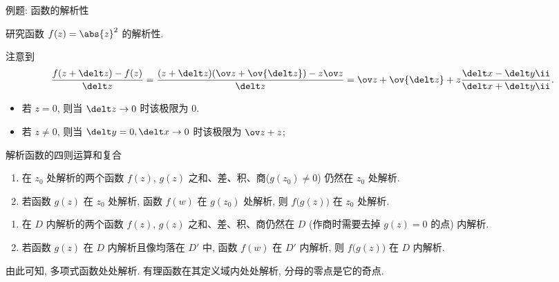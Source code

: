 \begin{frame}{例题: 函数的解析性}
	\onslide<+->
	\begin{example}[nearnext]
		研究函数 $f(z)=\abs{z}^2$ 的解析性.
	\end{example}
	\onslide<+->
	\begin{solution}[nearprev]
		注意到
		\[
			\frac{f(z+\delt z)-f(z)}{\delt z}
			=\frac{(z+\delt z)(\ov z+\ov{\delt z})-z\ov z}{\delt z}
			=\ov z+\ov{\delt z}+z\frac{\delt x-\delt y\ii}{\delt x+\delt y\ii}.
		\]
		\begin{itemize}
			\item 若 $z=0$, 则当 $\delt z\to 0$ 时该极限为 $0$.
			\item 若 $z\neq0$, 则当 $\delt y=0,\delt x\to 0$ 时该极限为 $\ov z+z$;
		\end{itemize}
	\end{solution}
\end{frame}


\begin{frame}{解析函数的四则运算和复合}
	\onslide<+->
	\begin{theorem}
		\begin{enumerate}
			\item 在 $z_0$ 处解析的两个函数 $f(z)$, $g(z)$ 之和、差、积、商($g(z_0)\neq 0$) 仍然在 $z_0$ 处解析.
			\item 若函数 $g(z)$ 在 $z_0$ 处解析, 函数 $f(w)$ 在 $g(z_0)$ 处解析, 则 $f\bigl(g(z)\bigr)$ 在 $z_0$ 处解析.
		\end{enumerate}
	\end{theorem}
	\onslide<+->
	\begin{theorem}
		\begin{enumerate}
			\item 在 $D$ 内解析的两个函数 $f(z)$, $g(z)$ 之和、差、积、商仍然在 $D$ (作商时需要去掉 $g(z)=0$ 的点) 内解析.
			\item 若函数 $g(z)$ 在 $D$ 内解析且像均落在 $D'$ 中, 函数 $f(w)$ 在 $D'$ 内解析, 则 $f\bigl(g(z)\bigr)$ 在 $D$ 内解析.
		\end{enumerate}
	\end{theorem}
	\onslide<+->
	由此可知, 多项式函数处处解析. 有理函数在其定义域内处处解析, 分母的零点是它的奇点.
\end{frame}


